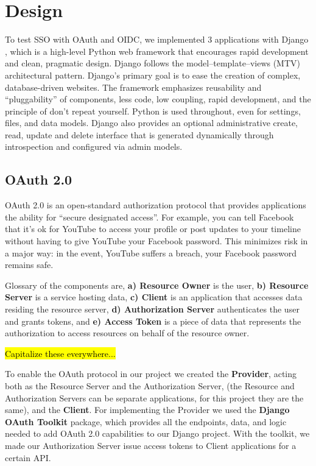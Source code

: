 \section{Design}

To test SSO with OAuth and OIDC, we implemented 3 applications with Django \cite{Django}, which is a high-level Python web framework that encourages rapid development and clean, pragmatic design. Django follows the model–template–views (MTV) architectural pattern. Django's primary goal is to ease the creation of complex, database-driven websites. The framework emphasizes reusability and ``pluggability'' of components, less code, low coupling, rapid development, and the principle of don't repeat yourself. Python is used throughout, even for settings, files, and data models. Django also provides an optional administrative create, read, update and delete interface that is generated dynamically through introspection and configured via admin models.



\subsection{OAuth 2.0}

OAuth 2.0 \cite{oauthtoolkit} is an open-standard authorization protocol that provides applications the ability for ``secure designated access''. For example, you can tell Facebook that it’s ok for YouTube to access your profile or post updates to your timeline without having to give YouTube your Facebook password. This minimizes risk in a major way: in the event, YouTube suffers a breach, your Facebook password remains safe.

Glossary of the components are, \textbf{a) Resource Owner} is the user, \textbf{b) Resource Server} is a service hosting data, \textbf{c) Client} is an application that accesses data residing the resource server, \textbf{d) Authorization Server} authenticates the user and grants tokens, and \textbf{e) Access Token} is a piece of data that represents the authorization to access resources on behalf of the resource owner.

\hl{Capitalize these everywhere...}

To enable the OAuth protocol in our project we created the \textbf{Provider}, acting both as the Resource Server and the Authorization Server, (the Resource and Authorization Servers can be separate applications, for this project they are the same), and the \textbf{Client}.
For implementing the Provider we used the \textbf{Django OAuth Toolkit} package, which provides all the endpoints, data, and logic needed to add OAuth 2.0 capabilities to our Django project.
With the toolkit, we made our Authorization Server issue access tokens to Client applications for a certain API.

